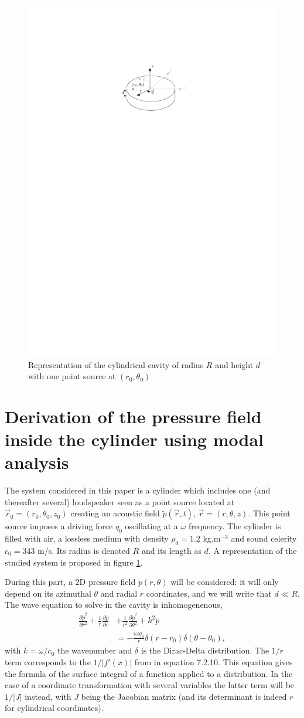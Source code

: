 \documentclass[%
 reprint,
 amsmath,amssymb,
 aps,
]{revtex4-2}
\begin{document}
\begin{figure}
    \centering
    \includegraphics[width=.35\textwidth]{figures/schema.pdf}
    \caption{Representation of the cylindrical cavity of radius $R$ and height $d$ with one point source at $(r_0, \theta_0)$}
    \label{fig:schema}
\end{figure}

\section{Derivation of the pressure field inside the cylinder using modal analysis}
The system considered in this paper is a cylinder which includes one (and thereafter several) loudspeaker seen as a point source located at $\vec{r}_0 = (r_0, \theta_0, z_0)$ creating an acoustic field $\tilde{p}(\vec{r}, t)$, $\vec{r} = (r, \theta, z)$. This point source imposes a driving force $q_0$ oscillating at a $\omega$ frequency. The cylinder is filled with air, a lossless medium with density $\rho_0 = 1.2$ kg.m$^{-3}$ and sound celerity $c_0 = 343$ m/s. Its radius is denoted $R$ and its length as $d$. A representation of the studied system is proposed in figure \ref{fig:schema}.

During this part, a 2D pressure field $\tilde{p}(r, \theta)$ will be considered: it will only depend on its azimuthal $\theta$ and radial $r$ coordinates, and we will write that $d \ll R$. The wave equation to solve in the cavity is inhomogenenous,
\begin{equation}
    \begin{split}
        \frac{\partial \tilde{p}^2}{\partial r^2} + \frac{1}{r} \frac{\partial \tilde{p}}{\partial r} &+ \frac{1}{r^2} \frac{\partial \tilde{p}^2}{\partial \theta^2} + k^2 \tilde{p}\\ &= -\frac{i \omega q_0}{r} \delta(r - r_0) \delta(\theta - \theta_0),
    \end{split} \label{eq:2dwaveq}
\end{equation}
with $k = \omega/c_0$ the wavenumber and $\delta$ is the Dirac-Delta distribution. The $1/r$ term corresponds to the $1/|f'(x)|$ from \cite{friedlander} in equation 7.2.10. This equation gives the formula of the surface integral of a function applied to a distribution. In the case of a coordinate transformation with several variables the latter term will be $1/|J|$ instead, with $J$ being the Jacobian matrix (and its determinant is indeed $r$ for cylindrical coordinates). 
\end{document}
